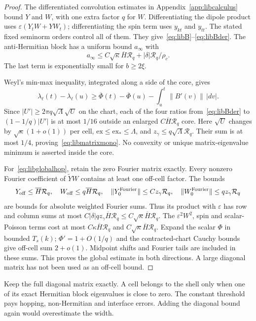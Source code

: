 \begin{proof}
The differentiated convolution estimates in
Appendix~\ref{app:libcalculus} bound $Y$ and $W$, with one extra
factor $q$ for $W$. Differentiating the dipole product uses
$\varepsilon(Y_tW+YW_t)$; differentiating the spin term uses
$y_{kt}$ and $y_{tt}$. The stated fixed seminorm orders control all
of them. They give~\eqref{eq:libB}--\eqref{eq:libBder}.
The anti-Hermitian block has a uniform bound $a_\infty$ with
\[
 a_\infty\le C\sqrt\kappa\overline H\mathcal R_q
                  +|\delta|\mathcal R_q/\rho_c.
\]
The last term is exponentially small for $b\ge2\xi$.

Weyl's min-max inequality, integrated along a side of the core,
gives
\[
 \lambda_\ell(t)-\lambda_\ell(u)
 \ge\overline\Phi(t)-\overline\Phi(u)-\int_u^t\|B'(v)\|\,|dv|.
\]
Since $|U'|\ge2\pi q\sqrt\Lambda\sqrt U$ on the chart,
each of the four ratios from~\eqref{eq:libBder} to
$(1-1/q)|U'|$ is at most $1/16$ outside an enlarged
$C\overline H\mathcal R_q$ core.
Here $\sqrt U$ changes by $\sqrt\kappa(1+o(1))$ per cell,
$\mathrm{ex}\le\mathrm{ex}_*\le\Lambda$, and
$z_\gamma\le q\sqrt\Lambda\mathcal R_q$.
Their sum is at most $1/4$, proving~\eqref{eq:libmatrixmono}.
No convexity or unique matrix-eigenvalue minimum is asserted inside
the core.

For~\eqref{eq:libglobalhop}, retain the zero Fourier matrix exactly.
Every nonzero Fourier coefficient of $\widetilde YW$ contains at
least one off-cell factor. The bounds
\[
 Y_{\rm off}\le\overline H\mathcal R_q,\quad
 W_{\rm off}\le q\overline H\mathcal R_q,\quad
 \|Y_0^{\rm Fourier}\|\le Cz_\gamma\mathcal R_q,\quad
 \|W_0^{\rm Fourier}\|\le qz_\gamma\mathcal R_q
\]
are bounds for absolute weighted Fourier sums. Thus its product
with $\varepsilon$ has row and column sums at most
$C|\delta|qz_\gamma\overline H\mathcal R_q
 \le C\sqrt\kappa\overline H\mathcal R_q$.
The $\varepsilon^2W^2$, spin and scalar-Poisson terms cost at most
$C\kappa\overline H\mathcal R_q$ and
$C\sqrt\kappa\overline H\mathcal R_q$.
Expand the scalar $\Phi$ in bounded $T_s(k)$; $\Phi'=1+O(1/q)$ and
the contracted-chart Cauchy bounds give off-cell sum $2+o(1)$.
Midpoint shifts and Fourier tails are included in these sums.
This proves the global estimate in both directions.
A large diagonal matrix has not been used as an off-cell bound.
\end{proof}

Keep the full diagonal matrix exactly. A cell belongs to the shell
only when one of its exact Hermitian block eigenvalues is close to
zero. The constant threshold pays hopping, non-Hermitian and
interface errors. Adding the diagonal bound again would overestimate
the width.

